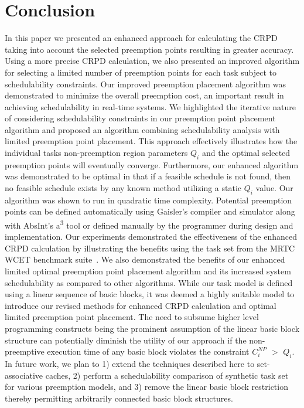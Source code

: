 \section{Conclusion}\label{sec:conclusion}

In this paper we presented an enhanced approach for calculating the
CRPD taking into account the selected preemption points resulting
in greater accuracy.  Using a more precise CRPD calculation, we also
presented an improved algorithm for selecting a limited number of
preemption points for each task subject to schedulability constraints.
Our improved preemption placement algorithm was demonstrated to
minimize the overall preemption cost, an important result in achieving
schedulability in real-time systems.  We highlighted the iterative nature
of considering schedulability constraints in our preemption point
placement algorithm and proposed an algorithm combining schedulability
analysis with limited preemption point placement.  This approach
effectively illustrates how the individual tasks non-preemption
region parameters $Q_i$ and the optimal selected preemption points will
eventually converge.  Furthermore, our enhanced algorithm was demonstrated to be
optimal in that if a feasible schedule is not found, then no feasible
schedule exists by any known method utilizing a static $Q_i$ value.  Our algorithm
was shown to run in quadratic time complexity.  Potential preemption points can be
defined automatically using Gaisler's compiler and simulator along with AbsInt's
a\textsuperscript{3} tool or defined manually by the programmer during design
and implementation. Our experiments demonstrated the effectiveness of
the enhanced CRPD calculation by illustrating the benefits using the
task set from the MRTC WCET benchmark suite~\cite{mrtc:01}.
We also demonstrated the benefits of our enhanced limited optimal preemption
point placement algorithm and its increased system schedulability as
compared to other algorithms.  While our task model is defined using a linear
sequence of basic blocks, it was deemed a highly suitable model to introduce
our revised methods for enhanced CRPD calculation and optimal limited
preemption point placement.  The need to subsume higher level programming constructs
being the prominent assumption of the linear basic block structure can potentially
diminish the utility of our approach if the non-preemptive execution time of any basic block
violates the constraint \begin{math}C_{i}^{NP}\end{math} \begin{math}>\end{math} \begin{math}Q_{i}\end{math}.
In future work, we plan to 1) extend the techniques described here to set-associative caches,
2) perform a schedulability comparison of synthetic task set for various preemption models, and
3) remove the linear basic block restriction thereby permitting arbitrarily connected basic
block structures.
